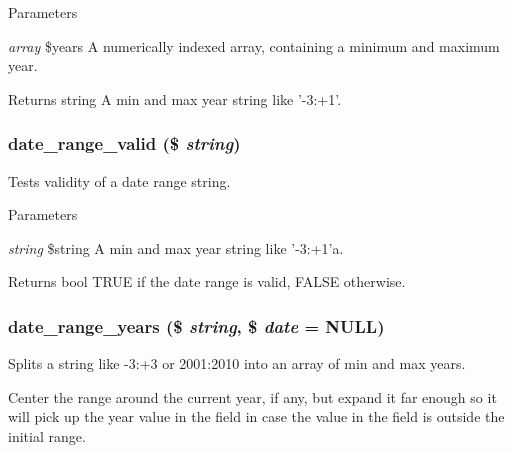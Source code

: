 \begin{DoxyParams}{Parameters}
\item[{\em array}]\$years A numerically indexed array, containing a minimum and maximum year.\end{DoxyParams}
\begin{DoxyReturn}{Returns}
string A min and max year string like '-\/3:+1'. 
\end{DoxyReturn}
\hypertarget{date__api_8module_a309e79ef85633987ce9641647d2e30ba}{
\subsubsection[{date\_\-range\_\-valid}]{\setlength{\rightskip}{0pt plus 5cm}date\_\-range\_\-valid (\$ {\em string})}}
\label{date__api_8module_a309e79ef85633987ce9641647d2e30ba}
Tests validity of a date range string.


\begin{DoxyParams}{Parameters}
\item[{\em string}]\$string A min and max year string like '-\/3:+1'a.\end{DoxyParams}
\begin{DoxyReturn}{Returns}
bool TRUE if the date range is valid, FALSE otherwise. 
\end{DoxyReturn}
\hypertarget{date__api_8module_ad70e453c5a043e53649a771c3a6713cf}{
\subsubsection[{date\_\-range\_\-years}]{\setlength{\rightskip}{0pt plus 5cm}date\_\-range\_\-years (\$ {\em string}, \/  \$ {\em date} = {\ttfamily NULL})}}
\label{date__api_8module_ad70e453c5a043e53649a771c3a6713cf}
Splits a string like -\/3:+3 or 2001:2010 into an array of min and max years.

Center the range around the current year, if any, but expand it far enough so it will pick up the year value in the field in case the value in the field is outside the initial range.


